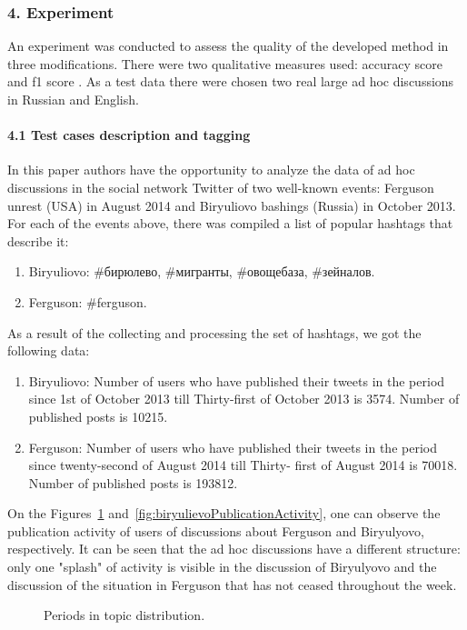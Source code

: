 \subsubsection{4. Experiment}
An experiment was conducted to assess the quality of the developed method in three modifications. There were two qualitative measures used: accuracy score and f1 score \cite{Powers}. As a test data there were chosen two real large ad hoc discussions \cite{SmoliarovaBlekanovBodrunova} in Russian and English.

\paragraph{4.1 Test cases description and tagging}
In this paper authors have the opportunity to analyze the data of ad hoc discussions in the social network Twitter of two well-known events: Ferguson unrest (USA) in August 2014 and Biryuliovo bashings (Russia) in October 2013. For each of the events above, there was compiled a list of popular hashtags that describe it:
\begin{enumerate}
	\item Biryuliovo: \#бирюлево, \#мигранты, \#овощебаза, \#зейналов.
	\item Ferguson: \#ferguson.
\end{enumerate}
As a result of the collecting and processing the set of hashtags, we got the following data:
\begin{enumerate}
	\item Biryuliovo: Number of users who have published their tweets in the period since 1st of October 2013 till Thirty-first of October 2013 is 3574. Number of published posts is 10215.
	\item Ferguson: Number of users who have published their tweets in the period since twenty-second of August 2014 till Thirty- first of August 2014 is 70018. Number of published posts is 193812.
\end{enumerate}
On the Figures~\cref{fig:fergusonPublicationActivity} and~\cref{fig:biryulievoPublicationActivity}, one can observe the publication activity of users of discussions about Ferguson and Biryulyovo, respectively. It can be seen that the ad hoc discussions have a different structure: only one "splash" of activity is visible in the discussion of Biryulyovo and the discussion of the situation in Ferguson that has not ceased throughout the week.

\begin{figure}[ht]
	\caption{Periods in topic distribution.}\label{fig:fergusonPublicationActivity}
\end{figure}

